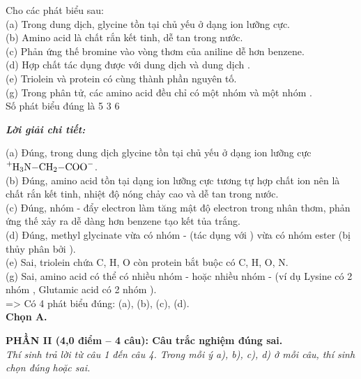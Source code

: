 \documentclass[11pt,a4paper]{article}
\def\loigiai#1{
\par\begingroup\color{blue!80!black}\small
\noindent\textbf{\textit{Lời giải chi tiết:}}\par
#1\par\endgroup}
\begin{document}
\begin{ex}
Cho các phát biểu sau:\\
(a) Trong dung dịch, glycine tồn tại chủ yếu ở dạng ion lưỡng cực.\\
(b) Amino acid là chất rắn kết tinh, dễ tan trong nước.\\
(c) Phản ứng thế bromine vào vòng thơm của aniline dễ hơn benzene.\\
(d) Hợp chất  tác dụng được với dung dịch  và dung dịch .\\
(e) Triolein và protein có cùng thành phần nguyên tố.\\
(g) Trong phân tử, các amino acid đều chỉ có một nhóm  và một nhóm .\\
Số phát biểu đúng là
\choice
{}
{5}
{3}
{6}
\loigiai{
(a) Đúng, trong dung dịch glycine tồn tại chủ yếu ở dạng ion lưỡng cực $\ce{^+H3N-CH2-COO-}$.\\
(b) Đúng, amino acid tồn tại dạng ion lưỡng cực tương tự hợp chất ion nên là chất rắn kết tinh, nhiệt độ nóng chảy cao và dễ tan trong nước.\\
(c) Đúng, nhóm -\ce{NH2} đẩy electron làm tăng mật độ electron trong nhân thơm, phản ứng thế \ce{Br2} xảy ra dễ dàng hơn benzene tạo kết tủa trắng.\\
(d) Đúng, methyl glycinate vừa có nhóm -\ce{NH2} (tác dụng với \ce{HCl}) vừa có nhóm ester (bị thủy phân bởi \ce{NaOH}).\\
(e) Sai, triolein chứa C, H, O còn protein bắt buộc có C, H, O, N.\\
(g) Sai, amino acid có thể có nhiều nhóm -\ce{NH2} hoặc nhiều nhóm -\ce{COOH} (ví dụ Lysine có 2 nhóm \ce{NH2}, Glutamic acid có 2 nhóm \ce{COOH}).\\
=> Có 4 phát biểu đúng: (a), (b), (c), (d).\\
\textbf{Chọn A.}}
\end{ex}




\vspace{0.15cm}
\noindent
\textbf{PHẦN II (4,0 điểm -- 4 câu): Câu trắc nghiệm đúng sai.}\\
\textit{Thí sinh trả lời từ câu 1 đến câu 4. Trong mỗi ý a), b), c), d) ở mỗi câu, thí sinh chọn đúng hoặc sai.}

\setcounter{ex}{0}
\end{document}
